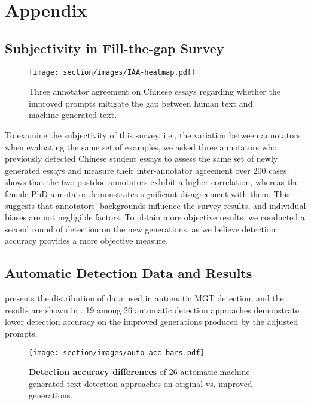 \clearpage
\section*{Appendix}
\appendix








\subsection{Subjectivity in Fill-the-gap Survey}
\label{app:subjectivity-test}
\begin{figure*}[t!]
    \centering
    \texttt{[image: section/images/IAA-heatmap.pdf]}
    \caption{Three annotator agreement on Chinese essays regarding whether the improved prompts mitigate the gap between human text and machine-generated text.}
    \label{fig:iaa-heatmap}
\end{figure*}

To examine the subjectivity of this survey, i.e., the variation between annotators when evaluating the same set of examples, we asked three annotators who previously detected Chinese student essays to assess the same set of newly generated essays and measure their inter-annotator agreement over 200 cases.
 shows that the two postdoc annotators exhibit a higher correlation, whereas the female PhD annotator demonstrates significant disagreement with them.
This suggests that annotators' backgrounds influence the survey results, and individual biases are not negligible factors.
To obtain more objective results, we conducted a second round of detection on the new generations, as we believe detection accuracy provides a more objective measure.

\subsection{Automatic Detection Data and Results}
 presents the distribution of data used in automatic MGT detection, and the results are shown in . 19 among 26 automatic detection approaches demonstrate lower detection accuracy on the improved generations produced by the adjusted prompts.

\begin{figure*}[ht!]
    \centering
    \texttt{[image: section/images/auto-acc-bars.pdf]}
    \caption{\textbf{Detection accuracy differences} of 26 automatic machine-generated text detection approaches on original vs. improved generations.}
    \label{fig:auto-acc-diff}
\end{figure*}

